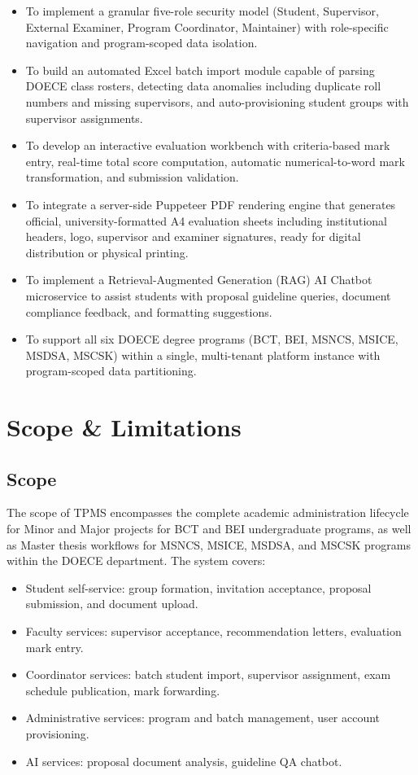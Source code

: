 \documentclass[12pt]{report}
\begin{document}
\begin{itemize}[leftmargin=*]
  \item To implement a granular five-role security model (Student, Supervisor, External Examiner, Program Coordinator, Maintainer) with role-specific navigation and program-scoped data isolation.
  \item To build an automated Excel batch import module capable of parsing DOECE class rosters, detecting data anomalies including duplicate roll numbers and missing supervisors, and auto-provisioning student groups with supervisor assignments.
  \item To develop an interactive evaluation workbench with criteria-based mark entry, real-time total score computation, automatic numerical-to-word mark transformation, and submission validation.
  \item To integrate a server-side Puppeteer PDF rendering engine that generates official, university-formatted A4 evaluation sheets including institutional headers, logo, supervisor and examiner signatures, ready for digital distribution or physical printing.
  \item To implement a Retrieval-Augmented Generation (RAG) AI Chatbot microservice to assist students with proposal guideline queries, document compliance feedback, and formatting suggestions.
  \item To support all six DOECE degree programs (BCT, BEI, MSNCS, MSICE, MSDSA, MSCSK) within a single, multi-tenant platform instance with program-scoped data partitioning.
\end{itemize}

\section{Scope \& Limitations}

\subsection{Scope}

The scope of TPMS encompasses the complete academic administration lifecycle for Minor and Major projects for BCT and BEI undergraduate programs, as well as Master thesis workflows for MSNCS, MSICE, MSDSA, and MSCSK programs within the DOECE department. The system covers:

\begin{itemize}[leftmargin=*]
  \item Student self-service: group formation, invitation acceptance, proposal submission, and document upload.
  \item Faculty services: supervisor acceptance, recommendation letters, evaluation mark entry.
  \item Coordinator services: batch student import, supervisor assignment, exam schedule publication, mark forwarding.
  \item Administrative services: program and batch management, user account provisioning.
  \item AI services: proposal document analysis, guideline QA chatbot.
\end{itemize}
\end{document}
